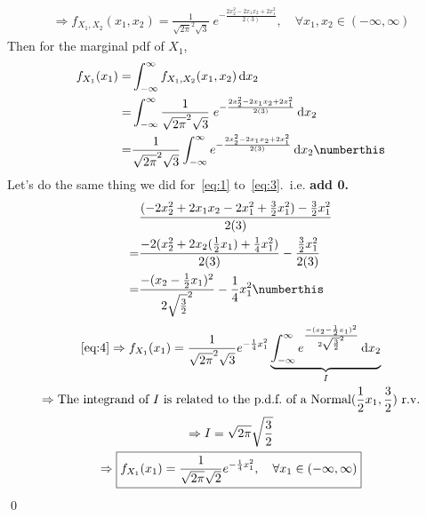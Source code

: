 \documentclass{mthe353answer}
\begin{document}
\begin{questions}
\begin{gather*}
    \Rightarrow 
    \boxed{f_{X_1,X_2}(x_1,x_2) = \frac{1}{\sqrt{2\pi}^2\sqrt{3}}\;e^{-\frac{2x_2^2-2x_1x_2+2x_1^2}{2(3)}},\quad \forall x_1,x_2 \in (-\infty,\infty)}
  \end{gather*}
  Then for the marginal pdf of \(X_1\),
  \begin{align*}
    f_{X_1}(x_1) =& \int_{-\infty}^{\infty} f_{X_1,X_2}(x_1,x_2) \,\mathrm{d}x_2\\
    =& \int_{-\infty}^{\infty} \frac{1}{\sqrt{2\pi}^2\sqrt{3}}\;e^{-\frac{2x_2^2-2x_1x_2+2x_1^2}{2(3)}} \,\mathrm{d}x_2 \\
    =& \frac{1}{\sqrt{2\pi}^2\sqrt{3}} \int_{-\infty}^{\infty} e^{-\frac{2x_2^2-2x_1x_2+2x_1^2}{2(3)}} \,\mathrm{d}x_2 \numberthis \label{eq:3}
  \end{align*}
  Let's do the same thing we did for~\eqref{eq:1} to~\eqref{eq:3}.\ i.e. \textbf{add 0.}
  \begin{align*}
     & \frac{(-2x_2^2+2x_1x_2-2x_1^2+\frac{3}{2}x_1^2)-\frac{3}{2}x_1^2}{2(3)}\\
    =& \frac{-2(x_2^2+2x_2(\frac{1}{2}x_1)+\frac{1}{4}x_1^2)}{2(3)}-\frac{\frac{3}{2}x_1^2}{2(3)}\\
    =& \frac{-(x_2-\frac{1}{2}x_1)^2}{2\sqrt{\frac{3}{2}}^2}-\frac{1}{4}x_1^2 \numberthis \label{eq:4}
  \end{align*}
  \begin{gather*}
    \text{\eqref{eq:4}} \Rightarrow f_{X_1}(x_1) = \frac{1}{\sqrt{2\pi}^2\sqrt{3}}e^{-\frac{1}{4}x_1^2} 
      \underbrace{\int_{-\infty}^{\infty} e^{\frac{-(x_2-\frac{1}{2}x_1)^2}{2\sqrt{\frac{3}{2}}^2}} \,\mathrm{d}x_2}_{I}\\
    \Rightarrow \text{The integrand of \(I\) is related to the p.d.f.\ of a Normal(\(\frac{1}{2}x_1, \frac{3}{2}\)) r.v.}\\
    \Rightarrow I = \sqrt{2\pi}\sqrt{\frac{3}{2}}\\
    \Rightarrow \boxed{f_{X_1}(x_1) = \frac{1}{\sqrt{2\pi}\sqrt{2}}e^{-\frac{1}{4}x_1^2},\quad \forall x_1 \in (-\infty,\infty)}\\
  \end{gather*}
  \hfill\qed{}
\end{questions}
\end{document}
